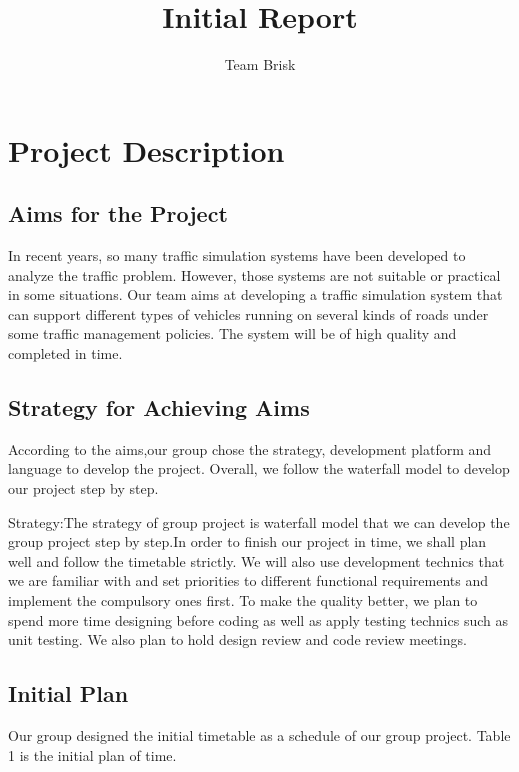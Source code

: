 \documentclass[12pt]{amsart}
\title{Initial Report}
\author{Team Brisk}
\begin{document}
\maketitle

\section{\textbf{Project Description}}
\subsection{\textbf{Aims for the Project}}
In recent years, so many traffic simulation systems have been developed to analyze the traffic problem. However, those systems are not suitable or practical in some situations. Our team aims at developing a traffic simulation system that can support different types of vehicles running on several kinds of roads under some traffic management policies. The system will be of high quality and completed in time.

\subsection{\textbf{Strategy for Achieving Aims}}
According to the aims,our group chose the strategy, development platform and language to develop the project. Overall, we follow the waterfall model to develop our project step by step.
	
Strategy:The strategy of group project is waterfall model that we can develop the group project step by step.In order to finish our project in time, we shall plan well and follow the timetable strictly. We will also use development technics that we are familiar with and set priorities to different functional requirements and implement the compulsory ones first. To make the quality better, we plan to spend more time designing before coding as well as apply testing technics such as unit testing. We also plan to hold design review and code review meetings.

\subsection{\textbf{Initial Plan}}
Our group designed the initial timetable as a schedule of our group project. Table 1 is the initial plan of time.
\end{document}
